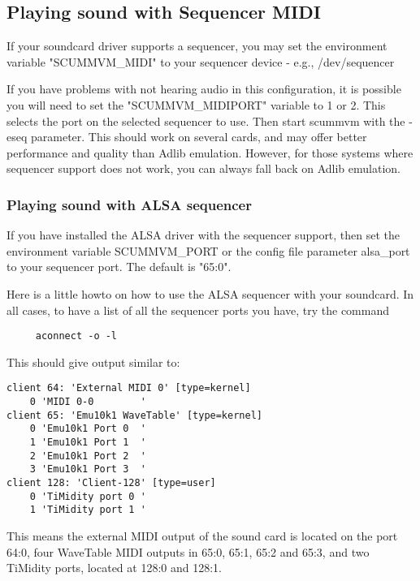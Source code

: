 

\subsection{Playing sound with Sequencer MIDI}

If your soundcard driver supports a sequencer, you may set the environment
variable "SCUMMVM\_MIDI" to your sequencer device - e.g., /dev/sequencer

If you have problems with not hearing audio in this configuration, it is
possible you will need to set the "SCUMMVM\_MIDIPORT" variable to 1 or 2. This
selects the port on the selected sequencer to use. Then start scummvm with the
-eseq parameter. This should work on several cards, and may offer better
performance and quality than Adlib emulation. However, for those systems where
sequencer support does not work, you can always fall back on Adlib emulation.


\subsubsection{Playing sound with ALSA sequencer}

If you have installed the ALSA driver with the sequencer support, then
set the environment variable SCUMMVM\_PORT or the config file parameter
alsa\_port to your sequencer port. The default is "65:0".

Here is a little howto on how to use the ALSA sequencer with your soundcard.
In all cases, to have a list of all the sequencer ports you have, try the
command 
\begin{verbatim}
     aconnect -o -l
\end{verbatim}
This should give output similar to:
\begin{verbatim}
client 64: 'External MIDI 0' [type=kernel]
    0 'MIDI 0-0        '
client 65: 'Emu10k1 WaveTable' [type=kernel]
    0 'Emu10k1 Port 0  '
    1 'Emu10k1 Port 1  '
    2 'Emu10k1 Port 2  '
    3 'Emu10k1 Port 3  '
client 128: 'Client-128' [type=user]
    0 'TiMidity port 0 '
    1 'TiMidity port 1 '
\end{verbatim}
%
This means the external MIDI output of the sound card is located on the
port 64:0, four WaveTable MIDI outputs in 65:0, 65:1, 65:2
and 65:3, and two TiMidity ports, located at 128:0 and 128:1.

